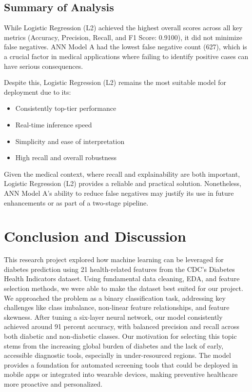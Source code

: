 \documentclass[conference]{IEEEtran}
\begin{document}
\subsection*{Summary of Analysis}

While Logistic Regression (L2) achieved the highest overall scores across all key metrics (Accuracy, Precision, Recall, and F1 Score: 0.9100), it did not minimize false negatives. ANN Model A had the lowest false negative count (627), which is a crucial factor in medical applications where failing to identify positive cases can have serious consequences.

Despite this, Logistic Regression (L2) remains the most suitable model for deployment due to its:
\begin{itemize}
  \item Consistently top-tier performance
  \item Real-time inference speed
  \item Simplicity and ease of interpretation
  \item High recall and overall robustness
\end{itemize}

Given the medical context, where recall and explainability are both important, Logistic Regression (L2) provides a reliable and practical solution. Nonetheless, ANN Model A's ability to reduce false negatives may justify its use in future enhancements or as part of a two-stage pipeline.


\section{Conclusion and Discussion}
This research project explored how machine learning can be leveraged for diabetes prediction using 21 health-related features from the CDC's Diabetes Health Indicators dataset. Using fundamental data cleaning, EDA, and feature selection methods, we were able to make the dataset best suited for our project. We approached the problem as a binary classification task, addressing key challenges like class imbalance, non-linear feature relationships, and feature skewness. After tuning a six-layer neural network, our model consistently achieved around 91 percent accuracy, with balanced precision and recall across both diabetic and non-diabetic classes. Our motivation for selecting this topic stems from the increasing global burden of diabetes and the lack of early, accessible diagnostic tools, especially in under-resourced regions. The model provides a foundation for automated screening tools that could be deployed in mobile apps or integrated into wearable devices, making preventive healthcare more proactive and personalized. \\
\end{document}
